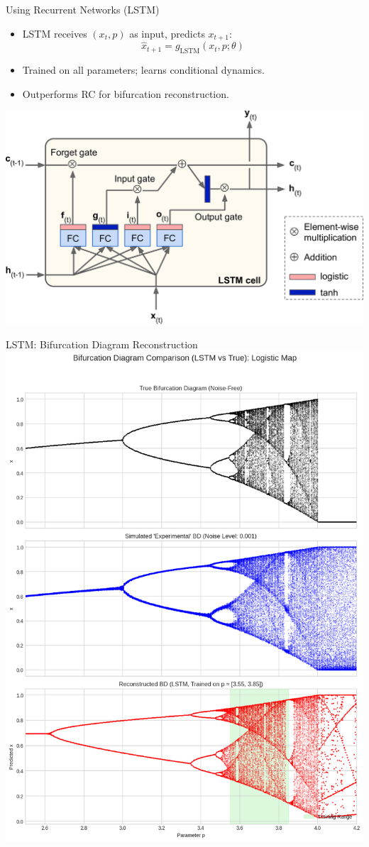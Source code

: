 \documentclass{beamer}
\begin{document}
\begin{frame}{Using Recurrent Networks (LSTM)}
  \begin{itemize}
    \item LSTM receives $(x_t, p)$ as input, predicts $x_{t+1}$:
      \[
        \hat{x}_{t+1} = g_{\text{LSTM}}(x_t, p; \theta)
      \]
    \item Trained on all parameters; learns conditional dynamics.
    \item Outperforms RC for bifurcation reconstruction.
  \end{itemize}
  \includegraphics[width=1\linewidth]{figures/LSTM_arch.png}
\end{frame}

\begin{frame}{LSTM: Bifurcation Diagram Reconstruction}
  \includegraphics[width=1.0\linewidth]{figures/lstm_bd_1.png}
\end{frame}
\end{document}
